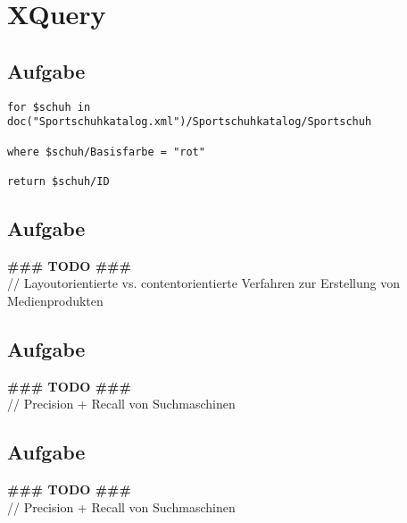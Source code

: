 

\section{XQuery}

\subsection{Aufgabe}

\lstset{language=PHP}
\begin{lstlisting}
for $schuh in doc("Sportschuhkatalog.xml")/Sportschuhkatalog/Sportschuh

where $schuh/Basisfarbe = "rot"

return $schuh/ID
\end{lstlisting} %


\subsection{Aufgabe}

\textbf{\#\#\# TODO \#\#\#}\\
// Layoutorientierte vs. contentorientierte Verfahren zur Erstellung von Medienprodukten

\subsection{Aufgabe}

\textbf{\#\#\# TODO \#\#\#}\\
// Precision + Recall von Suchmaschinen


\subsection{Aufgabe}

\textbf{\#\#\# TODO \#\#\#}\\
// Precision + Recall von Suchmaschinen



